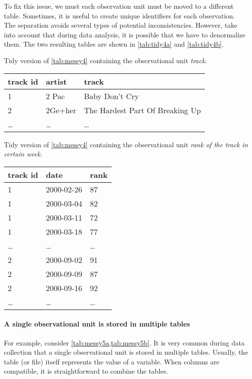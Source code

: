 To fix this issue, we must each observation unit must be moved to a different table.
Sometimes, it is useful to create unique identifiers for each observation.
The separation avoids several types of potential inconsistencies.  However, take into
account that during data analysis, it is possible that we have to denormalize them.  The
two resulting tables are shown in \cref{tab:tidy4a} and \cref{tab:tidy4b}.

\begin{tablebox}[label=tab:tidy4a]{Tidy version of \cref{tab:messy4} containing the observational unit \emph{track}.}
  \centering
  \begin{tabular}{lll}
    \toprule
    track id & artist & track \\
    \midrule
    1 & 2 Pac & Baby Don't Cry \\
    2 & 2Ge+her & The Hardest Part Of Breaking Up \\
    \dots & \dots & \dots \\
    \bottomrule
  \end{tabular}
\end{tablebox}

\begin{tablebox}[label=tab:tidy4b]{Tidy version of \cref{tab:messy4} containing the observational unit \emph{rank of the track in certain week}.}
  \centering
  \begin{tabular}{lll}
    \toprule
    track id & date & rank \\
    \midrule
    1 & 2000-02-26 & 87 \\
    1 & 2000-03-04 & 82 \\
    1 & 2000-03-11 & 72 \\
    1 & 2000-03-18 & 77 \\
    \dots & \dots & \dots \\
    2 & 2000-09-02 & 91 \\
    2 & 2000-09-09 & 87 \\
    2 & 2000-09-16 & 92 \\
    \dots & \dots & \dots \\
    \bottomrule
  \end{tabular}
\end{tablebox}

\paragraph{A single observational unit is stored in multiple tables}  For example, consider
\cref{tab:messy5a,tab:messy5b}.  It is very common during data
collection that a single observational unit is stored in multiple tables.  Usually, the
table (or file) itself represents the value of a variable.  When columns are compatible,
it is straightforward to combine the tables.

